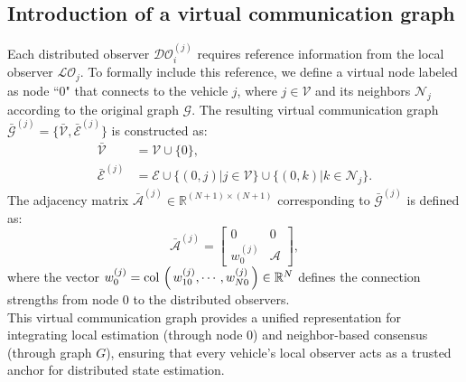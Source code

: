 \documentclass{ifacconf}
\def\col#1{\mathop{{\rm col}\,\left(\,#1\,\right)}}
\def\V{\mathcal{V}} %
\def\E{\mathcal{E}} %
\def\G{\mathcal{G}} %
\def\A{\mathcal{A}} %
\def\N{\mathcal{N}} %
\def\LO{\mathcal{LO}} %
\def\DO{\mathcal{DO}} %
\newtheorem{remark}{\it \textbf{Remark}}%
\begin{document}
\subsection{Introduction of a virtual communication graph}
\vspace*{-0.3cm}
Each distributed observer $\DO_{i}^{(j)}$ requires reference information from the local observer $\LO_{j}$.
    To formally include this reference, we define a virtual node labeled as node ``0" that connects to the vehicle $j$, where $j \in \V$ and its neighbors $\N_{j}$ according to the original graph $\G$. 
    The resulting virtual communication graph $\bar{\G}^{(j)} = \{ \bar{\V}, \bar{\E}^{(j)} \}$ is constructed as:
    \begin{equation}
        \begin{aligned}
            \bar{\V} &= \V \cup \{0\}, \\
            \bar{\E}^{(j)} &= \E \cup \{ (0,j) | j \in \V \} \cup \{ (0,k) | k \in \N_{j} \}.
        \end{aligned}
    \end{equation}
    The adjacency matrix $\bar{\A}^{(j)}  \in \mathbb{R}^{(N+1) \times (N+1)}$ corresponding to $\bar{\G}^{(j)}$ is defined as:
    \begin{equation}
        \bar{\A}^{(j)}  = \begin{bmatrix} 0 & 0 \\
                        w_{0}^{(j)} & \A \end{bmatrix},
    \end{equation}  
    where the vector $w_{0}^{(j)} = \col{w_{10}^{(j)}, \cdots, w_{N0}^{(j)}}  \in \mathbb{R}^{N}$ defines the connection strengths from node $0$ to the distributed observers.
    \\
    This virtual communication graph provides a unified representation for integrating local estimation (through node $0$) and neighbor-based consensus (through graph $G$), ensuring that every vehicle's local observer acts as a trusted anchor for distributed state estimation.
\end{document}
